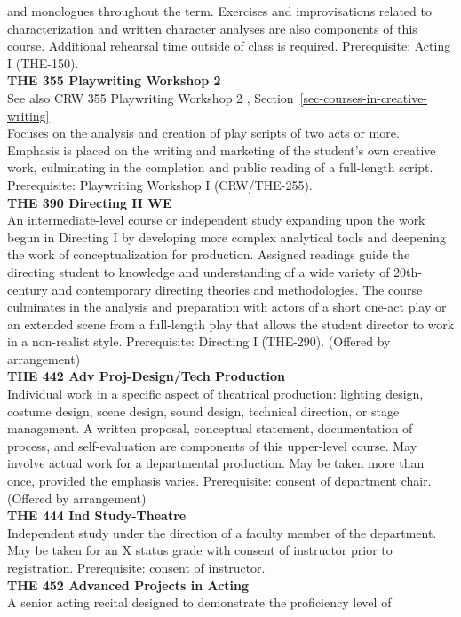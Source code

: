 \documentclass[
  letterpaper,
]{scrbook}
\begin{document}
and monologues throughout the term. Exercises and improvisations related
to characterization and written character analyses are also components
of this course. Additional rehearsal time outside of class is required.
Prerequisite: Acting I (THE-150).\\
\textbf{THE 355 Playwriting Workshop 2}\\
See also CRW 355 Playwriting Workshop 2 ,
Section~\ref{sec-courses-in-creative-writing}\\
Focuses on the analysis and creation of play scripts of two acts or
more. Emphasis is placed on the writing and marketing of the student's
own creative work, culminating in the completion and public reading of a
full-length script. Prerequisite: Playwriting Workshop I
(CRW/THE-255).\\
\textbf{THE 390 Directing II WE}\\
An intermediate-level course or independent study expanding upon the
work begun in Directing I by developing more complex analytical tools
and deepening the work of conceptualization for production. Assigned
readings guide the directing student to knowledge and understanding of a
wide variety of 20th-century and contemporary directing theories and
methodologies. The course culminates in the analysis and preparation
with actors of a short one-act play or an extended scene from a
full-length play that allows the student director to work in a
non-realist style. Prerequisite: Directing I (THE-290). (Offered by
arrangement)\\
\textbf{THE 442 Adv Proj-Design/Tech Production}\\
Individual work in a specific aspect of theatrical production: lighting
design, costume design, scene design, sound design, technical direction,
or stage management. A written proposal, conceptual statement,
documentation of process, and self-evaluation are components of this
upper-level course. May involve actual work for a departmental
production. May be taken more than once, provided the emphasis varies.
Prerequisite: consent of department chair. (Offered by arrangement)\\
\textbf{THE 444 Ind Study-Theatre}\\
Independent study under the direction of a faculty member of the
department. May be taken for an X status grade with consent of
instructor prior to registration. Prerequisite: consent of instructor.\\
\textbf{THE 452 Advanced Projects in Acting}\\
A senior acting recital designed to demonstrate the proficiency level of
\end{document}
